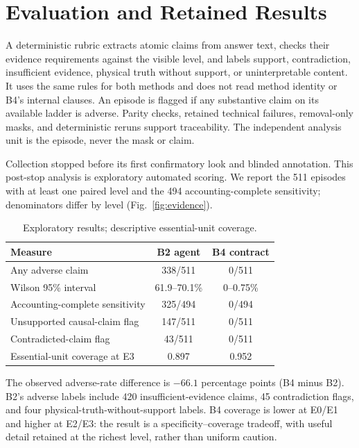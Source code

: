 \documentclass[conference]{IEEEtran}
\begin{document}
\section{Evaluation and Retained Results}
A deterministic rubric extracts atomic claims from answer text, checks their evidence requirements against the visible level, and labels support, contradiction, insufficient evidence, physical truth without support, or uninterpretable content. It uses the same rules for both methods and does not read method identity or B4's internal clauses. An episode is flagged if any substantive claim on its available ladder is adverse. Parity checks, retained technical failures, removal-only masks, and deterministic reruns support traceability. The independent analysis unit is the episode, never the mask or claim.

Collection stopped before its first confirmatory look and blinded annotation. This post-stop analysis is exploratory automated scoring. We report the 511 episodes with at least one paired level and the 494 accounting-complete sensitivity; denominators differ by level (Fig.~\ref{fig:evidence}).

\begin{table}[t]
\centering
\caption{Exploratory results; descriptive essential-unit coverage.}
\label{tab:results}
\footnotesize
\begin{tabular}{@{}lcc@{}}
\toprule
Measure & B2 agent & B4 contract \\
\midrule
Any adverse claim & 338/511 & 0/511 \\
\quad Wilson 95\% interval & 61.9--70.1\% & 0--0.75\% \\
Accounting-complete sensitivity & 325/494 & 0/494 \\
Unsupported causal-claim flag & 147/511 & 0/511 \\
Contradicted-claim flag & 43/511 & 0/511 \\
Essential-unit coverage at E3 & 0.897 & 0.952 \\
\bottomrule
\end{tabular}
\end{table}

The observed adverse-rate difference is $-66.1$ percentage points (B4 minus B2). B2's adverse labels include 420 insufficient-evidence claims, 45 contradiction flags, and four physical-truth-without-support labels. B4 coverage is lower at E0/E1 and higher at E2/E3: the result is a specificity--coverage tradeoff, with useful detail retained at the richest level, rather than uniform caution.
\end{document}
